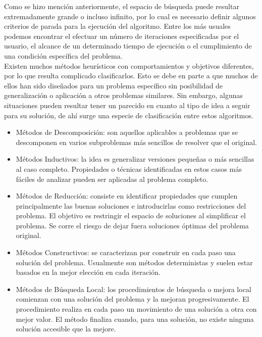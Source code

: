 \documentclass[a4paper,12pt]{book}
\begin{document}
	Como se hizo mención anteriormente, el espacio de búsqueda puede resultar extremadamente grande o incluso infinito, por lo cual es necesario definir algunos criterios de parada para la ejecución del algoritmo. Entre los más usuales podemos encontrar el efectuar un número de iteraciones especificadas por el usuario, el alcance de un determinado tiempo de ejecución o el cumplimiento de una condición específica del problema. \\
	
	Existen muchos métodos heurísticos con comportamientos y objetivos diferentes, por lo que resulta complicado clasificarlos. Esto se debe en parte a que muchos de  ellos  han  sido  diseñados para un problema específico sin posibilidad de generalización o aplicación a otros problemas similares. Sin embargo, algunas situaciones pueden resultar tener un parecido en cuanto al tipo de idea a seguir para su solución, de ahí surge una especie de clasificación entre estos algoritmos.
	
	\begin{itemize}
		\item Métodos de Descomposición: son aquellos aplicables a problemas que se descomponen en varios subproblemas más sencillos de resolver que el original.
		
		\item Métodos Inductivos: la idea es generalizar versiones pequeñas o más sencillas al caso completo. Propiedades o técnicas identificadas en estos casos más fáciles de analizar pueden ser aplicadas al problema completo.
		
		\item Métodos de Reducción: consiste en identificar propiedades que cumplen principalmente las buenas soluciones e introducirlas como restricciones del problema.  El objetivo es restringir el espacio de soluciones al simplificar el problema. Se corre el riesgo de dejar fuera soluciones óptimas del problema original.
		
		\item Métodos Constructivos: se caracterizan por construir en cada paso una solución del problema. Usualmente son  métodos deterministas y suelen estar basados en la mejor elección en cada iteración.
		
		\item Métodos de Búsqueda Local: los  procedimientos  de  búsqueda o mejora local comienzan con una solución del problema y la mejoran progresivamente.  El procedimiento realiza en cada paso un movimiento de una solución a otra con mejor valor. El método finaliza cuando, para una solución, no existe ninguna solución accesible que la mejore.	\end{itemize}
	
\end{document}

